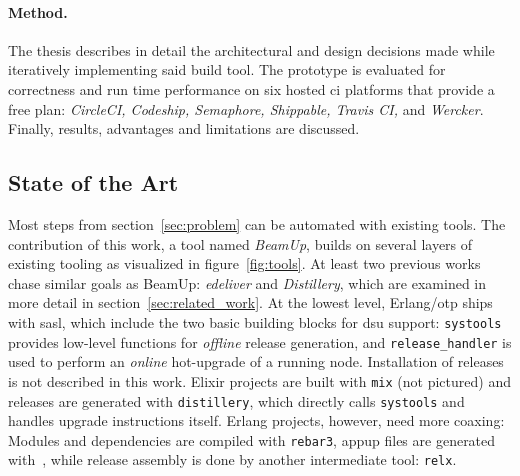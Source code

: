 \paragraph{Method.} The thesis describes in detail the architectural and design decisions made while iteratively implementing said build tool. The prototype is evaluated for correctness and run time performance on six hosted \acrshort{ci} platforms that provide a free plan: \emph{CircleCI, Codeship, Semaphore, Shippable, Travis CI,} and \emph{Wercker}. Finally, results, advantages and limitations are discussed.


\subsection{State of the Art} Most steps from section~\ref{sec:problem} can be automated with existing tools. The contribution of this work, a tool named \emph{BeamUp}, builds on several layers of existing tooling as visualized in figure~\ref{fig:tools}. At least two previous works chase similar goals as BeamUp: \emph{edeliver} and \emph{Distillery}, which are examined in more detail in section~\ref{sec:related_work}. At the lowest level, Erlang/\acrshort{otp} ships with \acrfull{sasl}, which include the two basic building blocks for \acrshort{dsu} support: \lstinline|systools| provides low-level functions for \emph{offline} release generation, and \lstinline|release_handler| is used to perform an \emph{online} hot-upgrade of a running node. Installation of releases is not described in this work.
Elixir projects are built with \lstinline|mix| (not pictured) and releases are generated with \lstinline|distillery|, which directly calls \lstinline|systools| and handles upgrade instructions itself. Erlang projects, however, need more coaxing: Modules and dependencies are compiled with \lstinline|rebar3|, \acrfull{appup} files are generated with~\cite{rebar3appup}, while release assembly is done by another intermediate tool: \lstinline|relx|.



